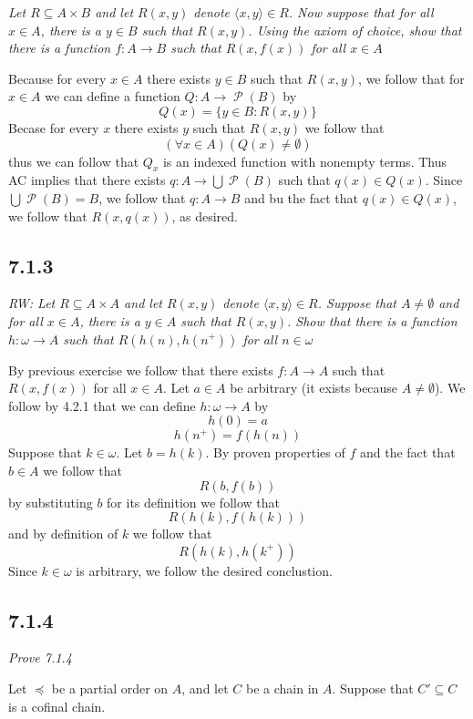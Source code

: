 \documentclass[11pt,oneside,titlepage]{book}
\DeclareMathOperator \pow {\mathcal {P}}
\newcommand{\eangle}[1]{\langle #1 \rangle}
\newcommand{\set}[1]{\{ #1 \}}
\begin{document}
\textit{Let $R \subseteq A \times B$ and let $R(x, y)$ denote $\eangle{x, y} \in R$. Now
  suppose that for all $x \in A$, there is a $y \in B$ such that $R(x, y)$. Using the
  axiom of choice, show that there is a function $f: A \to B$ such that $R(x, f(x))$
  for all $x \in A$}

Because for every $x \in A$ there exists $y \in B$ such that $R(x, y)$, we follow that
for $x \in A$ we can define a function $Q: A \to \pow(B)$ by
$$Q(x) = \set{y \in B: R(x, y)}$$
Becase for every $x$ there exists $y$ such that $R(x, y)$ we follow that
$$(\forall x \in A)(Q(x) \neq \emptyset)$$
thus we can follow that $Q_x$ is an indexed function with nonempty terms. Thus AC implies that
there exists $q: A \to \bigcup{\pow(B)}$ such that $q(x) \in Q(x)$. Since
$\bigcup{\pow(B)} = B$, we follow that $q: A \to B$ and bu the fact that $q(x) \in Q(x)$, we
follow that $R(x, q(x))$, as desired.

\subsection*{7.1.3}

\textit{RW: Let $R \subseteq A \times A$ and let $R(x, y)$ denote $\eangle{x, y} \in R$.
  Suppose that  $A \neq \emptyset$ and for all $x \in A$, there is a $y \in A$ such that $R(x, y)$.
  Show that there is a function $h: \omega \to A$ such that $R(h(n), h(n^+))$ for all $n \in
  \omega$ }

By previous exercise we follow that there exists $f: A \to A$ such that
$R(x, f(x))$ for all $x \in A$. Let $a \in A$ be arbitrary (it exists because $A \neq \emptyset$).
We follow by 4.2.1 that we can define
$h: \omega \to A$ by
$$h(0) = a$$
$$h(n^+) = f(h(n))$$
Suppose that $k \in \omega$. Let $b = h(k)$. By proven properties of $f$ and the fact that
$b \in A$ we  follow that
$$R(b, f(b))$$
by substituting $b$ for its definition we follow that
$$R(h(k), f(h(k)))$$
and by definition of $k$ we follow that
$$R(h(k), h(k^+))$$
Since $k \in \omega$  is arbitrary, we follow the desired conclustion.

\subsection*{7.1.4}

\textit{Prove 7.1.4}

Let $\preceq$ be a partial order on $A$, and let $C$ be a chain in $A$. Suppose that
$C' \subseteq C$ is a cofinal chain.
\end{document}
